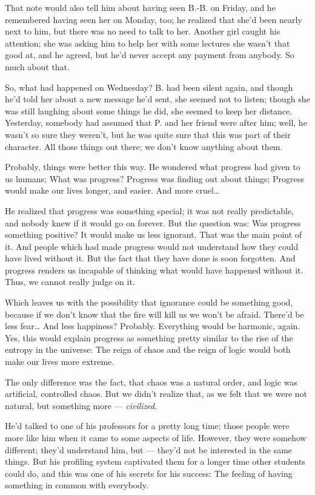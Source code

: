 That note would also tell him about having seen B.-B. on Friday, and he remembered having seen her on Monday, too; he realized that she'd been nearly next to him, but there was no need to talk to her. 
Another girl caught his attention; she was asking him to help her with some lectures she wasn't that good at, and he agreed, but he'd never accept any payment from anybody. 
So much about that.

So, what had happened on Wednesday? B. had been silent again, and though he'd told her about a new message he'd sent, she seemed not to listen; though she was still laughing about some things he did, she seemed to keep her distance. Yesterday, somebody had assumed that P. and her friend were after him; well, he wasn't so sure they weren't, but he was quite sure that this was part of their character. All those things out there; we don't know anything about them.

Probably, things were better this way. He wondered what progress had given to us humans; What was progress?
Progress was finding out about things; Progress would make our lives longer, and easier. And more cruel\ldots

He realized that progress was something special; it was not really predictable, and nobody knew if it would go on forever. But the question was: Was progress something positive?
It would make us less ignorant. That was the main point of it. And people which had made progress would not understand how they could have lived without it. But the fact that they have done is soon forgotten. And progress renders us incapable of thinking what would have happened without it. Thus, we cannot really judge on it.

Which leaves us with the possibility that ignorance could be something good, because if we don't know that the fire will kill us we won't be afraid. There'd be less fear\ldots
And less happiness? Probably. Everything would be harmonic, again. Yes, this would explain progress as something pretty similar to the rise of the entropy in the universe: The reign of chaos and the reign of logic would both make our lives more extreme.

The only difference was the fact, that chaos was a natural order, and logic was artificial, controlled chaos. 
But we didn't realize that, as we felt that we were not natural, but something more --- \emph{civilized}.

He'd talked to one of his professors for a pretty long time; those people were more like him when it came to some aspects of life. However, they were somehow different; they'd understand him, but --- they'd not be interested in the same things. But his profiling system captivated them for a longer time other students could do, and this was one of his secrets for his success: The feeling of having something in common with everybody.


